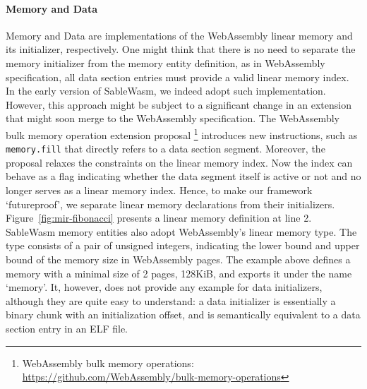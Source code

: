 \paragraph{Memory and Data}
Memory and Data are implementations of the WebAssembly linear memory and its
initializer, respectively. One might think that there is no need to separate the
memory initializer from the memory entity definition, as in WebAssembly
specification, all data section entries must provide a valid linear memory
index. In the early version of SableWasm, we indeed adopt such implementation.
However, this approach might be subject to a significant change in an extension
that might soon merge to the WebAssembly specification. The WebAssembly bulk
memory operation extension proposal \footnote{WebAssembly bulk memory
  operations: \\\url{https://github.com/WebAssembly/bulk-memory-operations}}
introduces new instructions, such as \texttt{memory.fill} that directly refers
to a data section segment. Moreover, the proposal relaxes the constraints on the
linear memory index. Now the index can behave as a flag indicating whether the
data segment itself is active or not and no longer serves as a linear memory
index. Hence, to make our framework `futureproof', we separate linear memory
declarations from their initializers. Figure~\ref{fig:mir-fibonacci} presents a
linear memory definition at line 2. SableWasm memory entities also adopt
WebAssembly's linear memory type. The type consists of a pair of unsigned
integers, indicating the lower bound and upper bound of the memory size in
WebAssembly pages. The example above defines a memory with a minimal size of 2
pages, 128KiB, and exports it under the name `memory'. It, however, does not
provide any example for data initializers, although they are quite easy to
understand: a data initializer is essentially a binary chunk with an
initialization offset, and is semantically equivalent to a data section entry
in an ELF file.

